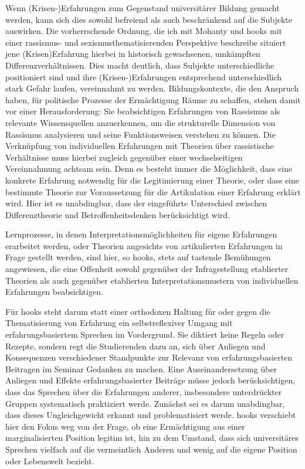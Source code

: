 Wenn (Krisen-)Erfahrungen zum Gegenstand universitärer Bildung gemacht werden,
kann sich dies sowohl befreiend als auch beschränkend auf die Subjekte
auswirken. Die vorherrschende Ordnung, die ich mit Mohanty und hooks mit einer
rassismus- und sexismusthematisierenden Perspektive beschreibe situiert jene
(Krisen)Erfahrung hierbei in historisch gewachsenen, umkämpften
Differenzverhältnissen. Dies macht deutlich, dass Subjekte unterschiedliche
positioniert sind und ihre (Krisen-)Erfahrungen entsprechend unterschiedlich
stark Gefahr laufen, vereinnahmt zu werden. Bildungskontexte, die den Anspruch
haben, für politische Prozesse der Ermächtigung Räume zu schaffen, stehen damit
vor einer Herausforderung: Sie beabsichtigen Erfahrungen von Rassismus als
relevante Wissensquellen anzuerkennen, um die strukturelle Dimension von
Rassismus analysieren und seine Funktionsweisen verstehen zu können. Die
Verknüpfung von individuellen Erfahrungen mit Theorien über rassistische
Verhältnisse muss hierbei zugleich gegenüber einer wechselseitigen
Vereinnahmung achtsam sein. Denn es besteht immer die Möglichkeit, dass eine
konkrete Erfahrung notwendig für die Legitimierung einer Theorie, oder dass
eine bestimmte Theorie zur Voraussetzung für die Artikulation einer Erfahrung
erklärt wird. Hier ist es unabdingbar, dass der eingeführte Unterschied
zwischen Differenztheorie und Betroffenheitsdenken berücksichtigt wird.

Lernprozesse, in denen Interpretationsmöglichkeiten für eigene Erfahrungen
erarbeitet werden, oder Theorien angesichts von artikulierten Erfahrungen in
Frage gestellt werden, sind hier, so hooks,  stets auf tastende Bemühungen
angewiesen, die eine Offenheit sowohl gegenüber der Infragestellung etablierter
Theorien als auch gegenüber etablierten Interpretationsmustern von
individuellen Erfahrungen beabsichtigen.\footnotemark{}

Für hooks steht darum statt einer orthodoxen Haltung für oder gegen die
Thematisierung von Erfahrung ein selbstreflexiver Umgang mit
erfahrungsbasiertem Sprechen im Vordergrund. Sie diktiert keine Regeln oder
Rezepte, sondern regt die Studierenden dazu an, sich über Anliegen und
Konsequenzen verschiedener Standpunkte zur Relevanz von erfahrungsbasierten
Beitragen im Seminar Gedanken zu machen. Eine Auseinandersetzung über Anliegen
und Effekte erfahrungsbasierter Beiträge müsse jedoch berücksichtigen, dass das
Sprechen über die Erfahrungen anderer, insbesondere unterdrückter Gruppen
systematisch praktiziert werde. Zunächst sei es darum unabdingbar, dass dieses
Ungleichgewicht erkannt und problematisiert werde.\footnotemark{} hooks verschiebt hier den
Fokus weg von der Frage, ob eine Ermächtigung aus einer marginalisierten
Position legitim ist, hin zu dem Umstand, dass sich universitäres Sprechen
vielfach auf die vermeintlich Anderen und wenig auf die eigene Position oder
Lebenswelt bezieht. 

